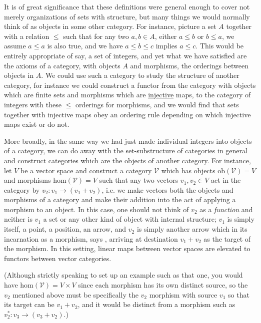 \documentclass[11pt]{article}
\begin{document}
It is of great significance that these definitions were general enough to cover not merely organizations of sets with structure, but many things we would normally think of as objects in some other category. For instance, picture a set $A$ together with a relation $\le$ such that for any two $a,b \in A$, either $a \le b$ or $b \le a$, we assume $a \le a$ is also true, and we have $a \le b \le c$ implies $a \le c$. This would be entirely appropriate of say, a set of integers, and yet what we have satisfied are the axioms of a category, with objects $A$ and morphisms, the orderings between objects in $A$. We could use such a category to study the structure of another category, for instance we could construct a functor from the category with objects which are finite sets and morphisms which are \hyperref[def:functionproperties]{injective} maps, to the category of integers with these $\le$ orderings for morphisms, and we would find that sets together with injective maps obey an ordering rule depending on which injective maps exist or do not. 

More broadly, in the same way we had just made individual integers into objects of a category, we can do away with the set-substructure of categories in general and construct categories which are the objects of another category. For instance, let $V$ be a vector space and construct a category $\mathcal{V}$ which has objects $\mathrm{ob}(\mathcal{V}) = V$ and morphisms $\mathrm{hom}(\mathcal{V}) = V$ such that any two vectors $v_1,v_2 \in V$ act in the category by $v_2 \colon v_1 \to (v_1 + v_2)$, i.e. we make vectors both the objects and morphisms of a category and make their addition into the act of applying a morphism to an object. In this case, one should not think of $v_2$ as a \emph{function} and neither is $v_1$ a set or any other kind of object with internal structure; $v_1$ is simply itself, a point, a position, an arrow, and $v_2$ is simply another arrow which in its incarnation as a morphism, says , arriving at destination $v_1 + v_2$ as the target of the morphism. In this setting, linear maps between vector spaces are elevated to functors between vector categories.

(Although strictly speaking to set up an example such as that one, you would have $\mathrm{hom}(\mathcal{V}) = V \times V$ since each morphism has its own distinct source, so the $v_2$ mentioned above must be specifically the $v_2$ morphism with source $v_1$ so that its target can be $v_1 + v_2$, and it would be distinct from a morphism such as $v_2^* \colon v_3 \to (v_3 + v_2)$.)
\end{document}
